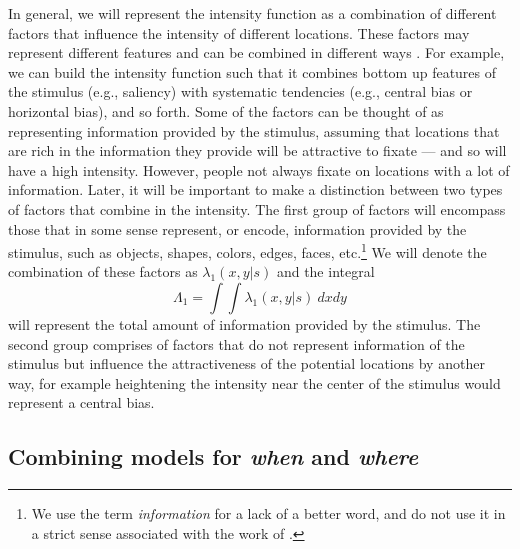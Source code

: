 \documentclass{article}
\begin{document}
In general, we will represent the intensity function as a combination of different factors that influence the intensity of different locations. These factors may represent different features and can be combined in different ways \citep[see][]{barthelme2013spatial}. For example, we can build the intensity function such that it combines bottom up features of the stimulus (e.g., saliency) with systematic tendencies (e.g., central bias or horizontal bias), and so forth. Some of the factors can be thought of as representing information provided by the stimulus, assuming that locations that are rich in the information they provide will be attractive to fixate --- and so will have a high intensity. However, people not always fixate on locations with a lot of information. Later, it will be important to make a distinction between two types of factors that combine in the intensity. The first group of factors will encompass those that in some sense represent, or encode, information provided by the stimulus, such as objects, shapes, colors, edges, faces, etc.\footnote{We use the term \textit{information} for a lack of a better word, and do not use it in a strict sense associated with the work of \citet{shannon1948communication}.} We will denote the combination of these factors as $\lambda_1(x, y |s)$ and the integral 
\begin{equation}
\Lambda_1 = \int\int \lambda_1(x, y | s)~dx dy
\end{equation}
will represent the total amount of information provided by the stimulus. The second group comprises of factors that do not represent information of the stimulus but influence the attractiveness of the potential locations by another way, for example heightening the intensity near the center of the stimulus would represent a central bias.


\subsection{Combining models for \textit{when} and \textit{where}}
\label{section:modelForWhenAndWhere}
\end{document}
